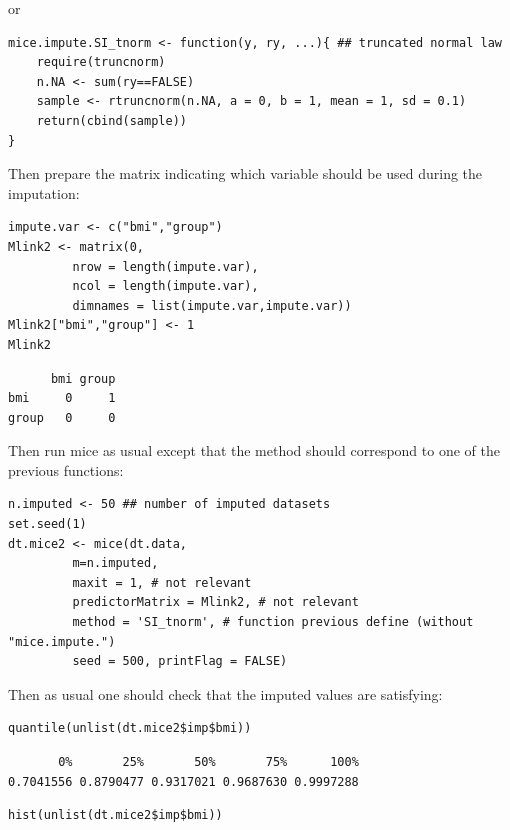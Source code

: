 \documentclass[12pt]{article}
\begin{document}
or

\lstset{language=r,label= ,caption= ,captionpos=b,numbers=none}
\begin{lstlisting}
mice.impute.SI_tnorm <- function(y, ry, ...){ ## truncated normal law
    require(truncnorm)
    n.NA <- sum(ry==FALSE)
    sample <- rtruncnorm(n.NA, a = 0, b = 1, mean = 1, sd = 0.1)
    return(cbind(sample))
}
\end{lstlisting}
Then prepare the matrix indicating which variable should be used
during the imputation:
\lstset{language=r,label= ,caption= ,captionpos=b,numbers=none}
\begin{lstlisting}
impute.var <- c("bmi","group")
Mlink2 <- matrix(0, 
		 nrow = length(impute.var), 
		 ncol = length(impute.var), 
		 dimnames = list(impute.var,impute.var))
Mlink2["bmi","group"] <- 1
Mlink2
\end{lstlisting}

\begin{verbatim}
      bmi group
bmi     0     1
group   0     0
\end{verbatim}

\clearpage 

Then run mice as usual except that the method should correspond to one of the previous functions:
\lstset{language=r,label= ,caption= ,captionpos=b,numbers=none}
\begin{lstlisting}
n.imputed <- 50 ## number of imputed datasets
set.seed(1)
dt.mice2 <- mice(dt.data,
		 m=n.imputed, 
		 maxit = 1, # not relevant
		 predictorMatrix = Mlink2, # not relevant
		 method = 'SI_tnorm', # function previous define (without "mice.impute.")
		 seed = 500, printFlag = FALSE)
\end{lstlisting}

Then as usual one should check that the imputed values are satisfying:
\lstset{language=r,label= ,caption= ,captionpos=b,numbers=none}
\begin{lstlisting}
quantile(unlist(dt.mice2$imp$bmi))
\end{lstlisting}

\begin{verbatim}
       0%       25%       50%       75%      100% 
0.7041556 0.8790477 0.9317021 0.9687630 0.9997288
\end{verbatim}


\lstset{language=r,label= ,caption= ,captionpos=b,numbers=none}
\begin{lstlisting}
hist(unlist(dt.mice2$imp$bmi))
\end{lstlisting}
\end{document}
